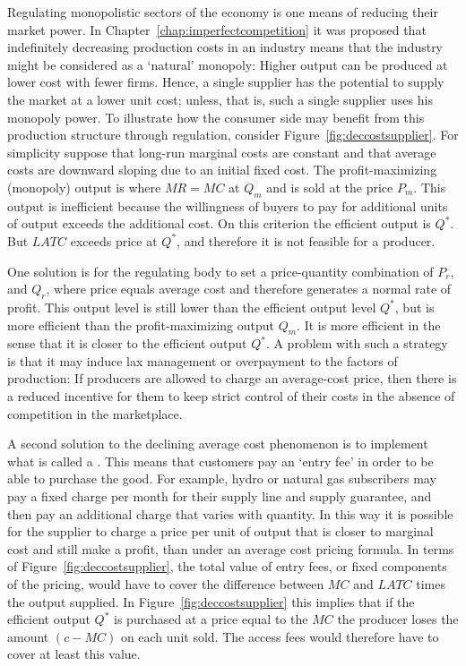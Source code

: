 Regulating monopolistic sectors of the economy is one means of reducing
their market power. In Chapter~\ref{chap:imperfectcompetition} it was
proposed that indefinitely decreasing production costs in an industry means
that the industry might be considered as a `natural' monopoly: Higher output
can be produced at lower cost with fewer firms. Hence, a single supplier has
the potential to supply the market at a lower unit cost; unless, that is,
such a single supplier uses his monopoly power. To illustrate how the
consumer side may benefit from this production structure through regulation,
consider Figure~\ref{fig:deccostsupplier}. For simplicity suppose that
long-run marginal costs are constant and that average costs are downward
sloping due to an initial fixed cost. The profit-maximizing (monopoly)
output is where $MR=MC$ at $Q_m$ and is sold at the price $P_m$. This output
is inefficient because the willingness of buyers to pay for additional units
of output exceeds the additional cost. On this criterion the efficient
output is $Q^*$. But $LATC$ exceeds price at $Q^*$, and therefore it is not
feasible for a producer.



\newhtmlpage

One solution is for the regulating body to set a price-quantity combination
of $P_r$, and $Q_r$, where price equals average cost and therefore generates
a normal rate of profit. This output level is still lower than the efficient
output level $Q^*$, but is more efficient than the profit-maximizing output 
$Q_m$. It is more efficient in the sense that it is closer to the efficient
output $Q^*$. A problem with such a strategy is that it may induce lax
management or overpayment to the factors of production: If producers are
allowed to charge an average-cost price, then there is a reduced incentive
for them to keep strict control of their costs in the absence of competition
in the marketplace.

A second solution to the declining average cost phenomenon is to implement
what is called a . This means that customers
pay an `entry fee' in order to be able to purchase the good. For example,
hydro or natural gas subscribers may pay a fixed charge per month for their
supply line and supply guarantee, and then pay an additional charge that
varies with quantity. In this way it is possible for the supplier to charge
a price per unit of output that is closer to marginal cost and still make a
profit, than under an average cost pricing formula. In terms of Figure~\ref{fig:deccostsupplier},
the total value of entry fees, or fixed components of
the pricing, would have to cover the difference between $MC$ and $LATC$
times the output supplied. In Figure~\ref{fig:deccostsupplier} this implies
that if the efficient output $Q^{*}$ is purchased at a price equal to
the $MC$ the producer loses the amount $(c-MC)$ on each unit sold. The
access fees would therefore have to cover at least this value.

